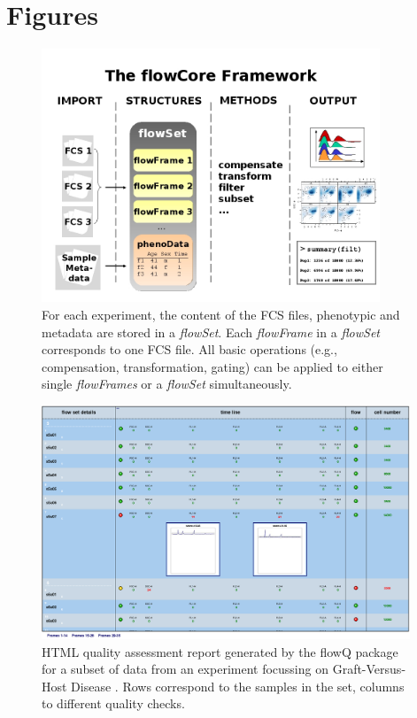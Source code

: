 \documentclass[12pt]{article}
\newcommand{\Rclass}[1]{{\textit{#1}}}
\begin{document}
\section*{Figures}
\begin{singlespace}
\begin{figure}[hp]
\centering
\includegraphics[width=0.9\textwidth]{Figure1-flowCoreFrameWork.jpg}
\caption{\label{fig1:FrameWork}{For each experiment, the content of
    the FCS files, phenotypic and metadata are stored in a
    \Rclass{flowSet}. Each \Rclass{flowFrame} in a \Rclass{flowSet}
    corresponds to one FCS file. All basic operations (e.g.,
    compensation, transformation, gating) can be applied to either
    single \Rclass{flowFrames} or a \Rclass{flowSet} simultaneously.}}
\end{figure}
\end{singlespace}


\begin{singlespace}
\begin{figure}[hp]
\centering
\includegraphics[width=0.98\textwidth]{flowQ.jpg}
\caption{\label{flowQ}%
  HTML quality assessment report generated by the flowQ package for a
  subset of data from an experiment focussing on Graft-Versus-Host
  Disease \citep{brinkman2007hcf}. Rows correspond to the samples in
  the set, columns to different quality checks.}
\end{figure}
\end{singlespace}
\end{document}
